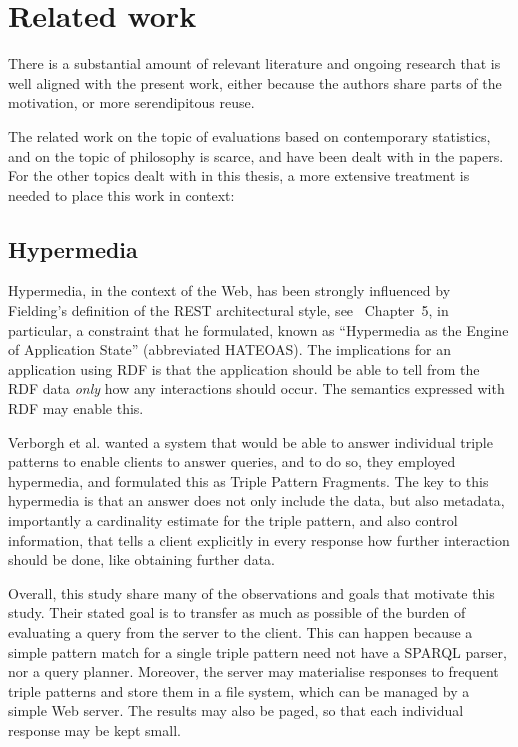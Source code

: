 \section{Related work}\label{sec:related}

There is a substantial amount of relevant literature and ongoing
research that is well aligned with the present work, either because
the authors share parts of the motivation, or more serendipitous
reuse.

The related work on the topic of evaluations based on contemporary
statistics, and on the topic of philosophy is scarce, and have been
dealt with in the papers. For the other topics dealt with in this
thesis, a more extensive treatment is needed to place this work in
context:

\subsection{Hypermedia}

Hypermedia, in the context of the Web, has been strongly influenced by
Fielding's definition of the REST architectural style, see
\cite{Fielding_2000_Architectural-Styles}~Chapter~5, in particular, a
constraint that he formulated, known as ``Hypermedia as the Engine of
Application State'' (abbreviated HATEOAS). The implications for an
application using RDF is that the application should be able to tell
from the RDF data \emph{only} how any interactions should occur. The
semantics expressed with RDF may enable this.

Verborgh et al. \cite{ldf1} wanted a system that would be able to
answer individual triple patterns to enable clients to answer queries,
and to do so, they employed hypermedia, and formulated this as Triple
Pattern Fragments. The key to this hypermedia is that an answer does
not only include the data, but also metadata, importantly a
cardinality estimate for the triple pattern, and also control
information, that tells a client explicitly in every response how
further interaction should be done, like obtaining further data.

Overall, this study share many of the observations and goals that
motivate this study. Their stated goal is to transfer as much as
possible of the burden of evaluating a query from the server to the
client. This can happen because a simple pattern match for a single
triple pattern need not have a SPARQL parser, nor a query
planner. Moreover, the server may materialise responses to frequent
triple patterns and store them in a file system, which can be managed
by a simple Web server. The results may also be paged, so that each
individual response may be kept small. 

